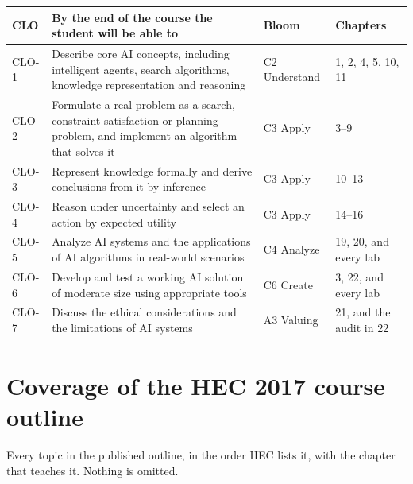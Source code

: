 \begin{longtable}{@{}L{1.3cm}L{7.6cm}L{2.1cm}L{3.8cm}@{}}
\toprule
{}
\textbf{CLO} & \textbf{By the end of the course the student will be able to} &
\textbf{Bloom} & \textbf{Chapters} \\
\midrule
\endhead
CLO-1 & Describe core AI concepts, including intelligent agents, search
algorithms, knowledge representation and reasoning & C2 Understand &
1, 2, 4, 5, 10, 11 \\
CLO-2 & Formulate a real problem as a search, constraint-satisfaction or planning
problem, and implement an algorithm that solves it & C3 Apply & 3--9 \\
CLO-3 & Represent knowledge formally and derive conclusions from it by
inference & C3 Apply & 10--13 \\
CLO-4 & Reason under uncertainty and select an action by expected utility &
C3 Apply & 14--16 \\
CLO-5 & Analyze AI systems and the applications of AI algorithms in real-world
scenarios & C4 Analyze & 19, 20, and every lab \\
CLO-6 & Develop and test a working AI solution of moderate size using appropriate
tools & C6 Create & 3, 22, and every lab \\
CLO-7 & Discuss the ethical considerations and the limitations of AI systems &
A3 Valuing & 21, and the audit in 22 \\
\bottomrule
\end{longtable}

\section*{Coverage of the HEC 2017 course outline}

Every topic in the published outline, in the order HEC lists it, with the chapter
that teaches it. Nothing is omitted.

